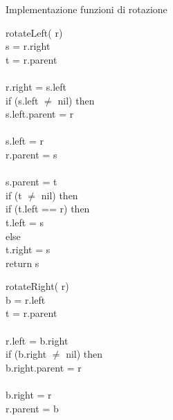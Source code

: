 \begin{code}{Implementazione funzioni di rotazione}
\begin{minipage}[t]{0.48\textwidth}
    \rmbreak\ind{} rotateLeft( r)\\
         s = r.right\\
         t = r.parent\\
        \nl\rmbreak\ind\\
        r.right = s.left\\
        \indf if (s.left $\neq$ nil) then\\
            s.left.parent = r\\
        \nl\rmbreak\ind\\
        s.left = r\\
        r.parent = s\\

        \nl\rmbreak\ind\\
        s.parent = t\\
        \indf if (t $\neq$ nil) then\\
            \indff if (t.left == r) then\\
                t.left = s\\
            \indff else\\
                t.right = s\\
        \indf return s\\
\end{minipage}
\hfill
\begin{minipage}[t]{0.48\textwidth}
    \rmbreak\ind{} rotateRight( r)\\
         b = r.left\\
         t = r.parent\\
        \nl\rmbreak\ind\\
        r.left = b.right\\
        \indf if (b.right $\neq$ nil) then\\
            b.right.parent = r\\
        \nl\rmbreak\ind\\
        b.right = r\\
        r.parent = b\\


\end{minipage}
\end{code}
